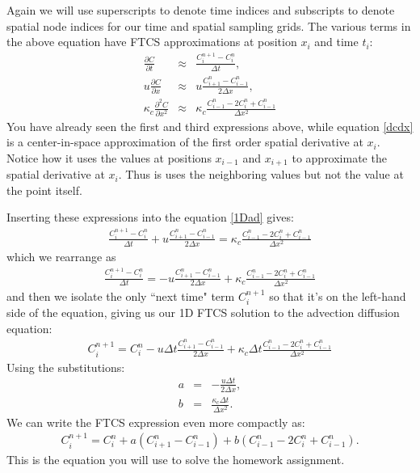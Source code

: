 \documentclass[11pt, oneside]{article}   	%
\begin{document}
Again we will use superscripts to denote time indices and subscripts to denote spatial node indices for our time and spatial sampling grids. The various terms in the above equation have FTCS approximations at position $ x_i$ and time $ t_i$:
\begin{eqnarray}
	\frac{\partial C}{\partial t} &\approx& \frac{C^{n+1}_i - C^n_i}{\Delta t} , \\
	u\frac{\partial C}{\partial x} &\approx& u \frac{C^{n}_{i+1} - C^n_{i-1}}{2\Delta x} , \label{dcdx} \\
	\kappa_c\frac{\partial^2 C}{\partial x^2} &\approx& \kappa_c \frac{C^{n}_{i-1} - 2 C^n_{i}+C^n_{i-1}}{\Delta x^2}
\end{eqnarray}
You have already seen the first and third expressions above, while equation \ref{dcdx} is a center-in-space approximation of the first order spatial derivative at $x_i$. Notice how it uses the values at positions $x_{i-1}$ and $x_{i+1}$ to approximate the spatial derivative at $x_i$. Thus is uses the neighboring values but not the value at the point itself. 

Inserting these expressions into the equation \ref{1Dad} gives:
\begin{eqnarray}
	 \frac{C^{n+1}_i - C^n_i}{\Delta t} + u \frac{C^{n}_{i+1} - C^n_{i-1}}{2\Delta x} = \kappa_c \frac{C^{n}_{i-1} - 2 C^n_{i}+C^n_{i-1}}{\Delta x^2}
\end{eqnarray}
which we rearrange as
\begin{eqnarray}
	 \frac{C^{n+1}_i - C^n_i}{\Delta t} = - u \frac{C^{n}_{i+1} - C^n_{i-1}}{2\Delta x} + \kappa_c \frac{C^{n}_{i-1} - 2 C^n_{i}+C^n_{i-1}}{\Delta x^2}
\end{eqnarray}
and then we isolate the only ``next time" term $C^{n+1}_i$ so that it's on the left-hand side of the equation, giving us our 1D FTCS solution to the advection diffusion equation:
\begin{eqnarray}
	C^{n+1}_i = C^n_i - u \Delta t \frac{C^{n}_{i+1} - C^n_{i-1}}{2\Delta x} + \kappa_c \Delta t \frac{C^{n}_{i-1} - 2 C^n_{i}+C^n_{i-1}}{\Delta x^2}
\end{eqnarray}
Using the substitutions:
\begin{eqnarray}
	a &=&  - \frac{ u \Delta t}{2\Delta x},  \\
	b &=&   \frac{\kappa_c \Delta t}{\Delta x^2}.
\end{eqnarray}
We can write the FTCS expression even more compactly as:
\begin{eqnarray}
	C^{n+1}_i = C^n_i + a \left ( {C^{n}_{i+1} - C^n_{i-1}}\right ) +  b 
\left ( {C^{n}_{i-1} - 2 C^n_{i}+C^n_{i-1}} \right ).
\end{eqnarray}
This is the equation you will use to solve the homework assignment.
\end{document}
